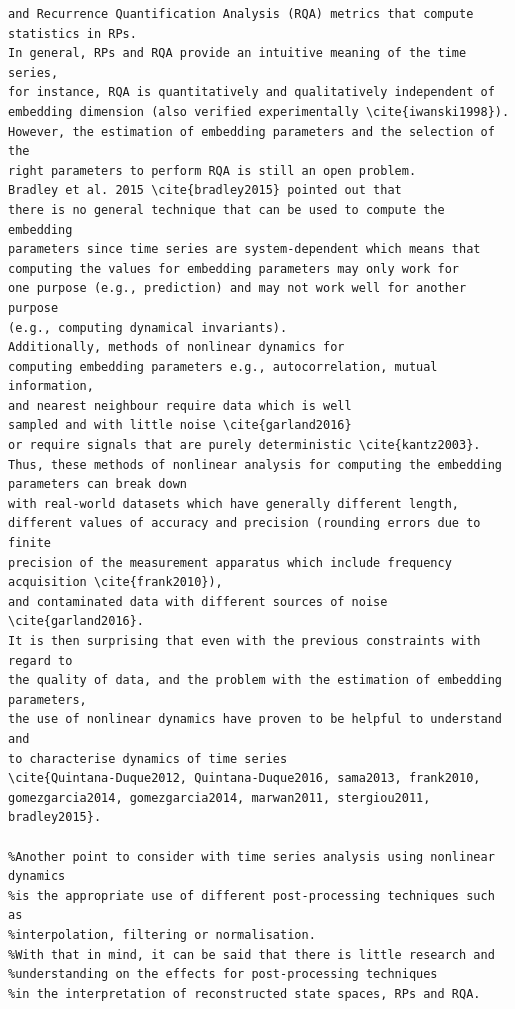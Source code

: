 \documentclass[10pt]{article}
\begin{document}
\begin{verbatim}
and Recurrence Quantification Analysis (RQA) metrics that compute statistics in RPs.
In general, RPs and RQA provide an intuitive meaning of the time series,
for instance, RQA is quantitatively and qualitatively independent of 
embedding dimension (also verified experimentally \cite{iwanski1998}).
However, the estimation of embedding parameters and the selection of the 
right parameters to perform RQA is still an open problem.
Bradley et al. 2015 \cite{bradley2015} pointed out that
there is no general technique that can be used to compute the embedding
parameters since time series are system-dependent which means that
computing the values for embedding parameters may only work for
one purpose (e.g., prediction) and may not work well for another purpose
(e.g., computing dynamical invariants).
Additionally, methods of nonlinear dynamics for 
computing embedding parameters e.g., autocorrelation, mutual information, 
and nearest neighbour require data which is well 
sampled and with little noise \cite{garland2016}
or require signals that are purely deterministic \cite{kantz2003}.
Thus, these methods of nonlinear analysis for computing the embedding 
parameters can break down
with real-world datasets which have generally different length, 
different values of accuracy and precision (rounding errors due to finite 
precision of the measurement apparatus which include frequency 
acquisition \cite{frank2010}),
and contaminated data with different sources of noise
\cite{garland2016}.
It is then surprising that even with the previous constraints with regard to 
the quality of data, and the problem with the estimation of embedding parameters,
the use of nonlinear dynamics have proven to be helpful to understand and 
to characterise dynamics of time series 
\cite{Quintana-Duque2012, Quintana-Duque2016, sama2013, frank2010,
gomezgarcia2014, gomezgarcia2014, marwan2011, stergiou2011, bradley2015}.

%Another point to consider with time series analysis using nonlinear dynamics
%is the appropriate use of different post-processing techniques such as 
%interpolation, filtering or normalisation.
%With that in mind, it can be said that there is little research and 
%understanding on the effects for post-processing techniques
%in the interpretation of reconstructed state spaces, RPs and RQA.


\end{verbatim}
\end{document}
